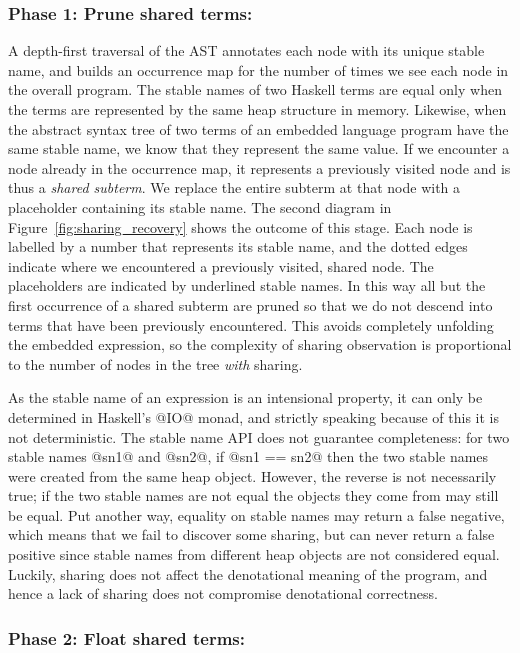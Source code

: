 \subsubsection*{Phase 1: Prune shared terms:}

A depth-first traversal of the AST annotates each node
with its unique stable name, and builds an occurrence map for
the number of times we see each node in the overall program. The stable names of
two Haskell terms are equal only when the terms are represented by the same heap
structure in memory. Likewise, when the abstract syntax tree of two terms of an
embedded language program have the same stable name, we know that they represent
the same value. If we encounter a node already in the occurrence map, it
represents a previously visited node and is thus a \emph{shared subterm}. We
replace the entire subterm at that node with a placeholder containing its stable
name. The second diagram in Figure~\ref{fig:sharing_recovery} shows the outcome
of this stage. Each node is labelled by a number that represents its stable name,
and the dotted edges indicate where we encountered a previously visited, shared
node. The placeholders are indicated by underlined stable names. In this way all
but the first occurrence of a shared subterm are pruned
so that we do not descend into terms that have been previously encountered. This
avoids completely unfolding the embedded expression, so the complexity of
sharing observation is proportional to the number of nodes in the tree
\emph{with} sharing.

As the stable name of an expression is an intensional property, it can only be
determined in Haskell's @IO@ monad, and strictly speaking because of this
it is not deterministic. The stable name API does not guarantee completeness:
for two stable names @sn1@ and @sn2@, if @sn1 == sn2@ then the
two stable names were created from the same heap object. However, the reverse is
not necessarily true; if the two stable names are not equal the objects they
come from may still be equal. Put another way, equality on stable names may
return a false negative, which means that we fail to discover some sharing, but
can never return a false positive since stable names from different heap objects
are not considered equal. Luckily, sharing does not affect the denotational
meaning of the program, and hence a lack of sharing does not compromise
denotational correctness.


\subsubsection*{Phase 2: Float shared terms:}

